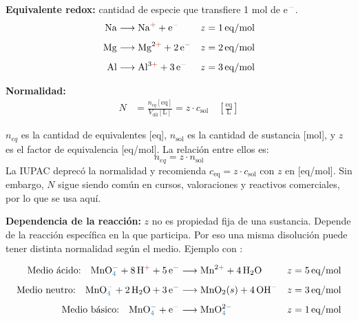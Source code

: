 \textbf{Equivalente redox:} cantidad de especie que transfiere 1 mol de 
e$^{\color{anblue}-}$.
\begin{align*}
    \ce{Na} &\longrightarrow \ce{Na}^{\color{catred}+} + \ce{e}^{\color{anblue}-} 
    & z &= 1\,\mathrm{eq/mol} \\[4pt]
    \ce{Mg} &\longrightarrow \ce{Mg}^{2\color{catred}+} + 2\,\ce{e}^{\color{anblue}-} 
    & z &= 2\,\mathrm{eq/mol} \\[4pt]
    \ce{Al} &\longrightarrow \ce{Al}^{3\color{catred}+} + 3\,\ce{e}^{\color{anblue}-} 
    & z &= 3\,\mathrm{eq/mol}
\end{align*}

\textbf{Normalidad:}
\begin{align*}
    N &= \frac{n_{eq}[\mathrm{eq}]}{V_{\mathrm{dil}}[\mathrm{L}]}
    = z \cdot c_{\mathrm{sol}}
    \quad \left[\frac{\mathrm{eq}}{\mathrm{L}}\right]
\end{align*}

\begin{notaimportante}
\(n_{eq}\) es la cantidad de equivalentes [eq], \(n_{\mathrm{sol}}\) es la 
cantidad de sustancia [mol], y \(z\) es el factor de equivalencia [eq/mol]. 
La relación entre ellos es:
\[
n_{eq} = z \cdot n_{\mathrm{sol}}
\]
La IUPAC deprecó la normalidad y recomienda \(c_{\mathrm{eq}} = z \cdot 
c_{\mathrm{sol}}\) con \(z\) en [eq/mol]. Sin embargo, \(N\) sigue siendo común 
en cursos, valoraciones y reactivos comerciales, por lo que se usa aquí.
\end{notaimportante}

\textbf{Dependencia de la reacción:} \(z\) no es propiedad fija de una sustancia. 
Depende de la reacción específica en la que participa. Por eso una misma disolución 
puede tener distinta normalidad según el medio. Ejemplo con :

\begin{align*}
    \text{Medio ácido:}\quad \ce{MnO4}^{\color{anblue}-} + 8\,\ce{H}^{\color{catred}+} + 5\,\ce{e}^{\color{anblue}-} 
    &\longrightarrow \ce{Mn}^{2\color{catred}+} + 4\,\ce{H2O} & z &= 5\,\mathrm{eq/mol} \\[4pt]
    \text{Medio neutro:}\quad \ce{MnO4}^{\color{anblue}-} + 2\,\ce{H2O} + 3\,\ce{e}^{\color{anblue}-} 
    &\longrightarrow \ce{MnO2}(s) + 4\,\ce{OH}^{\color{anblue}-} & z &= 3\,\mathrm{eq/mol} \\[4pt]
    \text{Medio básico:}\quad \ce{MnO4}^{\color{anblue}-} + \ce{e}^{\color{anblue}-} 
    &\longrightarrow \ce{MnO4}^{2\color{anblue}-} & z &= 1\,\mathrm{eq/mol}
\end{align*}

